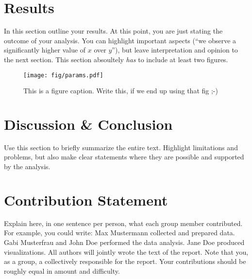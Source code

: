 \documentclass{article}
\theoremstyle{plain}
\theoremstyle{definition}
\theoremstyle{remark}
\begin{document}
% 

\section{Results}\label{sec:results}

In this section outline your results. At this point, you are just stating the outcome of your analysis. 
You can highlight important aspects (``we observe a significantly higher value of $x$ over $y$''), but leave interpretation and opinion to the next section. This section absoultely \emph{has} to include at least two figures.

\begin{figure*}
    \texttt{[image: fig/params.pdf]}
    \caption{This is a figure caption. Write this, if we end up using that fig ;-)}
\end{figure*}

\section{Discussion \& Conclusion}\label{sec:conclusion}

Use this section to briefly summarize the entire text. Highlight limitations and problems, but also make clear statements where they are possible and supported by the analysis. 

\section*{Contribution Statement}

Explain here, in one sentence per person, what each group member contributed. For example, you could write: Max Mustermann collected and prepared data. Gabi Musterfrau and John Doe performed the data analysis. Jane Doe produced visualizations. All authors will jointly wrote the text of the report. Note that you, as a group, a collectively responsible for the report. Your contributions should be roughly equal in amount and difficulty.
\end{document}
